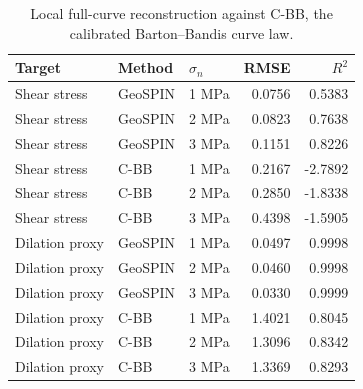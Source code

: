 \begin{table}
\caption{Local full-curve reconstruction against C-BB, the calibrated Barton--Bandis curve law.}
\label{tab:full_curve_metrics}
\begin{tabular}{lllrr}
\toprule
Target & Method & $\sigma_n$ & RMSE & $R^2$ \\
\midrule
Shear stress & GeoSPIN & 1 MPa & 0.0756 & 0.5383 \\
Shear stress & GeoSPIN & 2 MPa & 0.0823 & 0.7638 \\
Shear stress & GeoSPIN & 3 MPa & 0.1151 & 0.8226 \\
Shear stress & C-BB & 1 MPa & 0.2167 & -2.7892 \\
Shear stress & C-BB & 2 MPa & 0.2850 & -1.8338 \\
Shear stress & C-BB & 3 MPa & 0.4398 & -1.5905 \\
Dilation proxy & GeoSPIN & 1 MPa & 0.0497 & 0.9998 \\
Dilation proxy & GeoSPIN & 2 MPa & 0.0460 & 0.9998 \\
Dilation proxy & GeoSPIN & 3 MPa & 0.0330 & 0.9999 \\
Dilation proxy & C-BB & 1 MPa & 1.4021 & 0.8045 \\
Dilation proxy & C-BB & 2 MPa & 1.3096 & 0.8342 \\
Dilation proxy & C-BB & 3 MPa & 1.3369 & 0.8293 \\
\bottomrule
\end{tabular}
\end{table}
